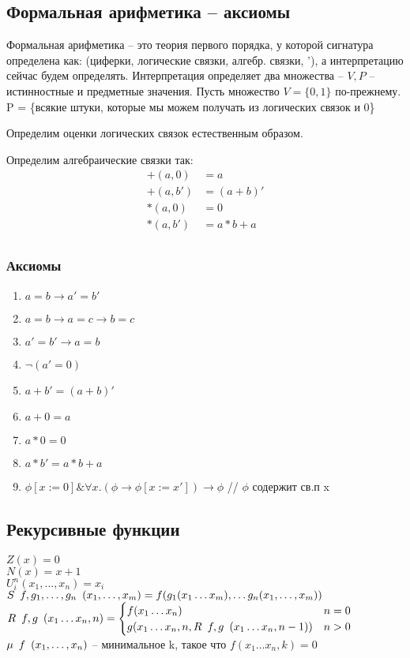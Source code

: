 \subsection{Формальная арифметика -- аксиомы}
\label{sec-2-20}
Формальная арифметика -- это теория первого порядка, у которой
сигнатура определена как: (циферки, логические связки, алгебр.
связки, '), а интерпретацию сейчас будем определять.
Интерпретация определяет два множества -- $V, P$ -- истинностные и
предметные значения. Пусть множество $V = \lbrace 0, 1 \rbrace$ по-прежнему.
P = \{всякие штуки, которые мы можем получать из логических связок и 0\}

Определим оценки логических связок естественным образом.

Определим алгебраические связки так:
\begin{align*}
    +(a, 0) &= a \\
    +(a, b')& = (a + b)' \\
    *(a, 0) &= 0 \\
    *(a, b')& = a * b + a \\
\end{align*}
\subsubsection{Аксиомы}
\label{sec-2-20-1}
\begin{enumerate}
\item $a = b \to a' = b'$
\item $a = b \to a = c \to b = c$
\item $a' = b' \to a = b$
\item $\lnot (a' = 0)$
\item $a + b' = (a + b)'$
\item $a + 0 = a$
\item $a * 0 = 0$
\item $a * b' = a * b + a$
\item $\phi[x:=0] \& \forall x.(\phi \to \phi[x:=x']) \to \phi$ // $\phi$ содержит св.п x
\end{enumerate}
\subsection{Рекурсивные функции}
\label{sec-2-21}
$Z(x) = 0$\\
$N(x) = x + 1$\\
$U^n_i(x_1,\dotsc, x_n) = x_i$\\
$S\ltemplate f, g_1, \dotsc, g_n\rtemplate (x_1,\dotsc,x_m) = f(g_1(x_1\ldots{}x_m),\ldots{}g_n(x_1,\dotsc,x_m))$\\
$R\ltemplate f, g\rtemplate(x_1\ldots{}x_n, n) = \begin{cases}
    f(x_1\ldots{}x_n) & n = 0 \\
    g(x_1\ldots{}x_n, n, R\ltemplate f, g\rtemplate(x_1\ldots{}x_n, n - 1)) & n > 0
\end{cases}$\\
$\mu\ltemplate f\rtemplate(x_1, \dotsc, x_n)$ -- минимальное k, такое что $f(x_1\ldots{}x_n, k) = 0$
